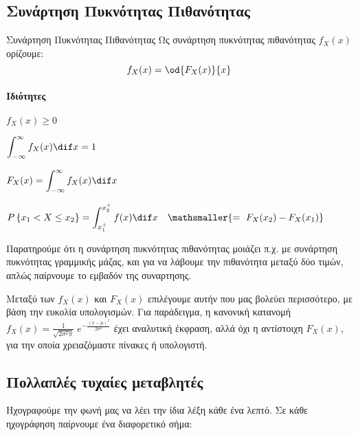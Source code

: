 \documentclass[11pt,a4paper,notitlepage,fleqn,final]{article}
\begin{document}
	\subsection{Συνάρτηση Πυκνότητας Πιθανότητας}
	\begin{defn}{Συνάρτηση Πυκνότητας Πιθανότητας}{}
		Ως συνάρτηση πυκνότητας πιθανότητας \( f_X(x) \) ορίζουμε:
		\[
		f_X(x) = \od{F_X(x)}{x}
		\]
	\end{defn}
	\paragraph{Ιδιότητες}
	\begin{enumroman}
		\item \( f_X(x) \geq 0 \)
		\item \( \displaystyle
		\int_{-\infty}^{\infty} f_X(x) \dif x = 1\)
		\item \( \displaystyle
		F_X(x) = \int_{-\infty}^{\infty} f_X(x)\dif x \)
		\item \( \displaystyle
		P\left\lbrace x_1 < X \leq x_2 \right\rbrace 
		= \int_{x_1^+}^{x_2^+} f(x)\dif x \quad
		\mathsmaller{=\ F_X(x_2) - F_X(x_1)}
		\)
	\end{enumroman}
	
	\begin{center}
	\end{center}
	
	Παρατηρούμε ότι η συνάρτηση πυκνότητας πιθανότητας μοιάζει π.χ. με
	συνάρτηση πυκνότητας γραμμικής μάζας, και για να λάβουμε την
	πιθανότητα μεταξύ δύο τιμών, απλώς παίρνουμε το εμβαδόν της
	συναρτησης.
	
	Μεταξύ των \( f_X(x) \) και \( F_X(x) \) επιλέγουμε αυτήν που μας
	βολεύει περισσότερο, με βάση την ευκολία υπολογισμών. Για
	παράδειγμα, η κανονική κατανομή \( f_X(x) =
	\frac{1}{\sqrt{2\sigma^2\pi} } \; e^{ -\frac{(x-\mu)^2}{2\sigma^2} } 
	\) έχει αναλυτική έκφραση, αλλά όχι η αντίστοιχη \( F_X(x) \), για
	την οποία χρειαζόμαστε πίνακες ή υπολογιστή.
	
	\subsection{Πολλαπλές τυχαίες μεταβλητές}
	Ηχογραφούμε την φωνή μας να λέει την ίδια λέξη κάθε ένα λεπτό. Σε
	κάθε ηχογράφηση παίρνουμε ένα διαφορετικό σήμα:
	
	
\end{document}
